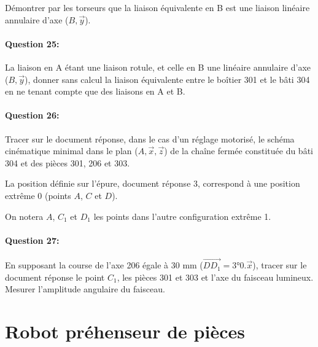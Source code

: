 Démontrer par les torseurs que la liaison équivalente en B est une liaison linéaire annulaire d'axe ($B,\overrightarrow{y}$).

\paragraph{Question 25:} La liaison en A étant une liaison rotule, et celle en B une linéaire annulaire d'axe ($B,\overrightarrow{y}$), donner sans calcul la liaison équivalente entre le boîtier 301 et le bâti 304 en ne tenant compte que des liaisons en A et B.

\paragraph{Question 26:} Tracer sur le document réponse, dans le cas d'un réglage motorisé, le schéma cinématique minimal dans le plan ($A,\overrightarrow{x},\overrightarrow{z}$) de la chaîne fermée constituée du bâti 304 et des pièces 301, 206 et 303.

La position définie sur l'épure, document réponse 3, correspond à une position extrême 0 (points $A$, $C$ et $D$).

On notera $A$, $C_1$ et $D_1$ les points dans l'autre configuration extrême 1.

\paragraph{Question 27:} En supposant la course de l'axe 206 égale à 30 mm ($\overrightarrow{DD_1}=3°0.\overrightarrow{x}$), tracer sur le document réponse le point $C_1$, les pièces 301 et 303 et l'axe du faisceau lumineux. Mesurer l'amplitude angulaire du faisceau.

\newpage

\section{Robot préhenseur de pièces}

